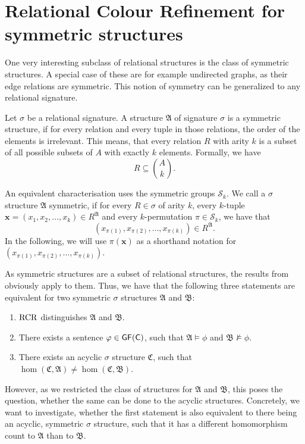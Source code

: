 \section {Relational Colour Refinement for symmetric structures}

One very interesting subclass of relational structures is the class of symmetric structures.
A special case of these are for example undirected graphs, as their edge relations are symmetric.
This notion of symmetry can be generalized to any relational signature.

\begin{definition}
	Let $\sigma$ be a relational signature.
	A structure $\mathfrak A$ of signature $\sigma$ is a symmetric structure, if for every relation and every tuple in those relations, the order of the elements is irrelevant.
	This means, that every relation $R$ with arity $k$ is a subset of all possible subsets of $A$ with exactly $k$ elements.
	Formally, we have
	$$R\subseteq \binom{A}{k}.$$
\end{definition}
An equivalent characterisation uses the symmetric groups $\mathcal S_k$.
We call a $\sigma$ structure $\mathfrak A$ symmetric, if for every $R\in \sigma$ of arity $k$, every $k$-tuple $\mathbf x=(x_1,x_2,\dots,x_k)\in R^{\mathfrak A}$ and every $k$-permutation $\pi\in \mathcal S_k$, we have that
$$(x_{\pi(1)},x_{\pi(2)},\dots,x_{\pi(k)})\in R^{\mathfrak A}.$$
In the following, we will use $\pi(\mathbf x)$ as a shorthand notation for $(x_{\pi(1)},x_{\pi(2)},\dots,x_{\pi(k)})$.

As symmetric structures are a subset of relational structures, the results from \cite{scheidt2025ColorRefinement} obviously apply to them.
Thus, we have that the following three statements are equivalent for two symmetric $\sigma$ structures $\mathfrak A$ and $\mathfrak B$:
\begin{enumerate}
	\item $\operatorname{RCR}$ distinguishes $\mathfrak A$ and $\mathfrak B$.
	\item There exists a sentence $\varphi\in\mathsf{GF}(\mathsf{C})$, such that $\mathfrak A\models \phi$ and $\mathfrak B\not\models \phi$.
	\item There exists an acyclic $\sigma$ structure $\mathfrak C$, such that $\hom(\mathfrak C,\mathfrak A)\neq\hom(\mathfrak C,\mathfrak B)$.
\end{enumerate}
However, as we restricted the class of structures for $\mathfrak A$ and $\mathfrak B$, this poses the question, whether the same can be done to the acyclic structures.
Concretely, we want to investigate, whether the first statement is also equivalent to there being an acyclic, symmetric $\sigma$ structure, such that it has a different homomorphism count to $\mathfrak A$ than to $\mathfrak B$.

